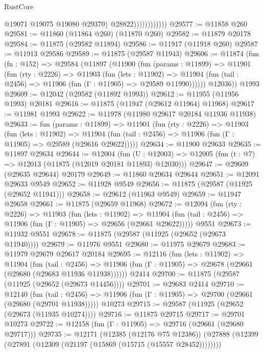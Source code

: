 \begin{lexlean}{RustCore}
\begin{coremodule}
                              @19071
                              @19075
                              @19080
                              @29370)
                            @28822))))))))))))
@29577 := @11858 @260
@29581 := @11860 (@11864 @260) (@11870 @260)
@29582 := @11879 @20178
@29584 := @11875 (@29582 @11894)
@29586 := @11917 (@11918 @260)
@29587 := @11913 @29586
@29589 := @11875 (@29587 @11943)
@29606 := @11874
    (fun (fn : @152) =>
    @29584
      (@11897
        (@11900
          (fun (params : @11899) =>
          @11901
            (fun (rty : @2226) =>
            @11903
              (fun (lets : @11902) =>
              @11904 (fun (tail : @2456) => @11906 (fun (Γ : @11905) => @29589 @11990))))))
        @12036))
    @1993
@29609 := @12042 (@29582 (@11892 @1993))
@29612 := @11955 (@11956 @1993) @20181
@29616 := @11875 (@11947 (@29612 @11964) @11968)
@29617 := @11981 @1993
@29622 := @11978 (@11980 @29617 @20184 @11936 @11938)
@29633 := fun (params : @11899) =>
  @11901
    (fun (rty : @2226) =>
    @11903
      (fun (lets : @11902) =>
      @11904 (fun (tail : @2456) => @11906 (fun (Γ : @11905) => @29589 (@29616 @29622)))))
@29634 := @11900 @29633
@29635 := @11897 @29634
@29644 := @12004
    (fun (U : @12003) => @12005 (fun (t : @7) => @12013 (@11875 (@12019 @20181 @11893) @12030)))
@29647 := @29609 (@29635 @29644) @20179
@29649 := @11860 @29634 @29644
@29651 := @12091 @29633 @9549
@29652 := @11928 @9549
@29656 := @11875 (@29587 (@11925 (@29652 @11941)))
@29658 := @29612 (@11963 @9549)
@29659 := @11947 @29658
@29661 := @11875 (@29659 @11968)
@29672 := @12094
    (fun (rty : @2226) =>
    @11903
      (fun (lets : @11902) =>
      @11904 (fun (tail : @2456) => @11906 (fun (Γ : @11905) => @29656 (@29661 @29622)))))
    @9551
@29673 := @11932 @9551
@29678 := @11875 (@29587 (@11925 (@29652 (@29673 @11940))))
@29679 := @11976 @9551
@29680 := @11975 @29679
@29683 := @11979 @29679 @29617 @20184
@29695 := @12116
    (fun (lets : @11902) =>
    @11904
      (fun (tail : @2456) =>
      @11906 (fun (Γ : @11905) => @29678 (@29661 (@29680 (@29683 @11936 @11938))))))
    @2414
@29700 := @11875 (@29587 (@11925 (@29652 (@29673 @14456))))
@29701 := @29683 @2414
@29710 := @12140
    (fun (tail : @2456) => @11906 (fun (Γ : @11905) => @29700 (@29661 (@29680 (@29701 @11938)))))
    @10273
@29715 := @29587 (@11925 (@29652 (@29673 (@11935 @10274))))
@29716 := @11875 @29715
@29717 := @29701 @10273
@29722 := @12158 (fun (Γ : @11905) => @29716 (@29661 (@29680 @29717)))
@29735 := @12171
    (@12385 (@12176 @75 @12386))
    (@27888 (@12399 (@27891 (@12309 (@21197 (@15869 (@15715 (@15557 @28452))))))))

\end{coremodule}
\end{lexlean}
